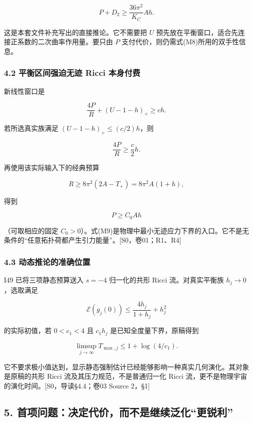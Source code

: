 \documentclass[UTF8,a4paper,11pt,fontset=fandol]{ctexart}
\begin{document}
\[
\boxed{P+D_2\ge\frac{36\pi^2}{K_C}Ah.}
\tag{M7}
\]

这是本套文件补充写出的直接推论。它不需要把 \(U\)
预先放在平衡窗口，适合先连接正系数的二次曲率作用量。要只由 \(P\)
支付代价，则仍需式(M8)所用的双手性信息。

\subsubsection{4.2 平衡区间强迫无迹 Ricci
本身付费}\label{ux5e73ux8861ux533aux95f4ux5f3aux8febux65e0ux8ff9-ricci-ux672cux8eabux4ed8ux8d39}

新线性窗口是

\[
\frac{4P}{R}+(U-1-h)_+\ge ch.
\tag{M8}
\]

若所选真实族满足 \((U-1-h)_+\le(c/2)h\)，则

\[
\frac{4P}{R}\ge\frac c2h.
\]

再使用该实际输入下的经典预算

\[
R\ge8\pi^2(2A-T_+)=8\pi^2A(1+h),
\]

得到

\[
\boxed{P\ge C_0Ah}
\tag{M9}
\]

（可取相应的固定
\(C_0>0\)）。式(M9)是物理中最小无迹应力下界的入口。它不是无条件的``任意拓扑荷都产生引力能量''。{[}S0，卷01；R1、R4{]}

\subsubsection{4.3
动态推论的准确位置}\label{ux52a8ux6001ux63a8ux8bbaux7684ux51c6ux786eux4f4dux7f6e}

I49 已将三项静态预算送入 \(s=-4\) 归一化的共形 Ricci 流。对真实平衡族
\(h_j\to0\)，选取满足

\[
\mathcal E(g_j(0))\le\frac{4h_j}{1+h_j}+h_j^2
\]

的实际初值，若 \(0<c_1<4\) 且 \(c_1h_j\) 是已知全度量下界，原稿得到

\[
\limsup_{j\to\infty}T_{\max,j}\le1+\log(4/c_1).
\tag{M9a}
\]

它不要求极小值达到，显示静态强制估计已经能够影响一种真实几何演化。其对象是原稿的共形
Ricci 流及其压力规范，不是普通归一化 Ricci
流，更不是物理宇宙的演化时间。{[}S0，导读§4.4；卷03 Source 2，§1{]}

\subsection{5.
首项问题：决定代价，而不是继续泛化``更锐利''}\label{ux9996ux9879ux95eeux9898ux51b3ux5b9aux4ee3ux4ef7ux800cux4e0dux662fux7ee7ux7eedux6cdbux5316ux66f4ux9510ux5229}
\end{document}
